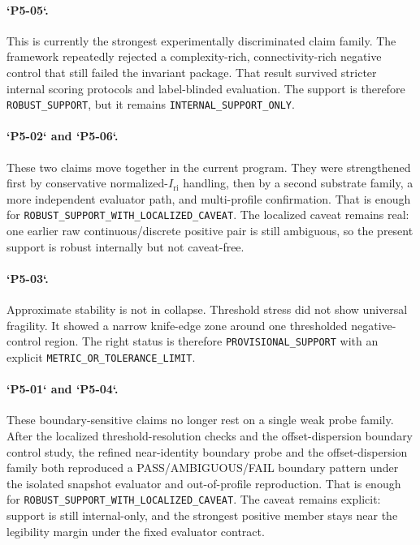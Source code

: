 \documentclass[11pt,a4paper]{article}
\newcommand{\Iri}{I_{\mathrm{ri}}}
\newcommand{\Status}[1]{\texttt{#1}}
\begin{document}
\paragraph{`P5-05`.}
This is currently the strongest experimentally discriminated claim family. The framework repeatedly rejected a complexity-rich, connectivity-rich negative control that still failed the invariant package. That result survived stricter internal scoring protocols and label-blinded evaluation. The support is therefore \Status{ROBUST\_SUPPORT}, but it remains \Status{INTERNAL\_SUPPORT\_ONLY}.

\paragraph{`P5-02` and `P5-06`.}
These two claims move together in the current program. They were strengthened first by conservative normalized-$\Iri$ handling, then by a second substrate family, a more independent evaluator path, and multi-profile confirmation. That is enough for \Status{ROBUST\_SUPPORT\_WITH\_LOCALIZED\_CAVEAT}. The localized caveat remains real: one earlier raw continuous/discrete positive pair is still ambiguous, so the present support is robust internally but not caveat-free.

\paragraph{`P5-03`.}
Approximate stability is not in collapse. Threshold stress did not show universal fragility. It showed a narrow knife-edge zone around one thresholded negative-control region. The right status is therefore \Status{PROVISIONAL\_SUPPORT} with an explicit \Status{METRIC\_OR\_TOLERANCE\_LIMIT}.

\paragraph{`P5-01` and `P5-04`.}
These boundary-sensitive claims no longer rest on a single weak probe family. After the localized threshold-resolution checks and the offset-dispersion boundary control study, the refined near-identity boundary probe and the offset-dispersion family both reproduced a PASS/\allowbreak AMBIGUOUS/\allowbreak FAIL boundary pattern under the isolated snapshot evaluator and out-of-profile reproduction. That is enough for \Status{ROBUST\_SUPPORT\_WITH\_LOCALIZED\_CAVEAT}. The caveat remains explicit: support is still internal-only, and the strongest positive member stays near the legibility margin under the fixed evaluator contract.
\end{document}
